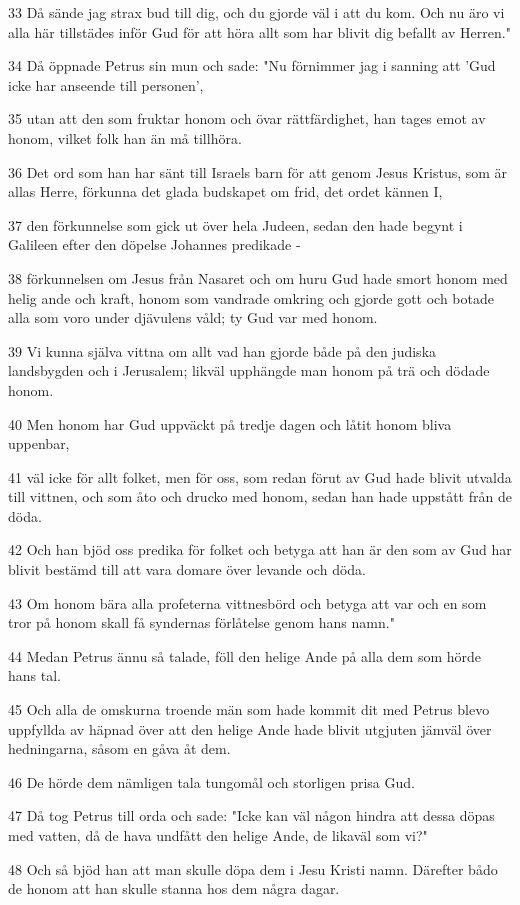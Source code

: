 \par 33 Då sände jag strax bud till dig, och du gjorde väl i att du kom. Och nu äro vi alla här tillstädes inför Gud för att höra allt som har blivit dig befallt av Herren."
\par 34 Då öppnade Petrus sin mun och sade: "Nu förnimmer jag i sanning att 'Gud icke har anseende till personen',
\par 35 utan att den som fruktar honom och övar rättfärdighet, han tages emot av honom, vilket folk han än må tillhöra.
\par 36 Det ord som han har sänt till Israels barn för att genom Jesus Kristus, som är allas Herre, förkunna det glada budskapet om frid, det ordet kännen I,
\par 37 den förkunnelse som gick ut över hela Judeen, sedan den hade begynt i Galileen efter den döpelse Johannes predikade -
\par 38 förkunnelsen om Jesus från Nasaret och om huru Gud hade smort honom med helig ande och kraft, honom som vandrade omkring och gjorde gott och botade alla som voro under djävulens våld; ty Gud var med honom.
\par 39 Vi kunna själva vittna om allt vad han gjorde både på den judiska landsbygden och i Jerusalem; likväl upphängde man honom på trä och dödade honom.
\par 40 Men honom har Gud uppväckt på tredje dagen och låtit honom bliva uppenbar,
\par 41 väl icke för allt folket, men för oss, som redan förut av Gud hade blivit utvalda till vittnen, och som åto och drucko med honom, sedan han hade uppstått från de döda.
\par 42 Och han bjöd oss predika för folket och betyga att han är den som av Gud har blivit bestämd till att vara domare över levande och döda.
\par 43 Om honom bära alla profeterna vittnesbörd och betyga att var och en som tror på honom skall få syndernas förlåtelse genom hans namn."
\par 44 Medan Petrus ännu så talade, föll den helige Ande på alla dem som hörde hans tal.
\par 45 Och alla de omskurna troende män som hade kommit dit med Petrus blevo uppfyllda av häpnad över att den helige Ande hade blivit utgjuten jämväl över hedningarna, såsom en gåva åt dem.
\par 46 De hörde dem nämligen tala tungomål och storligen prisa Gud.
\par 47 Då tog Petrus till orda och sade: "Icke kan väl någon hindra att dessa döpas med vatten, då de hava undfått den helige Ande, de likaväl som vi?"
\par 48 Och så bjöd han att man skulle döpa dem i Jesu Kristi namn. Därefter bådo de honom att han skulle stanna hos dem några dagar.

